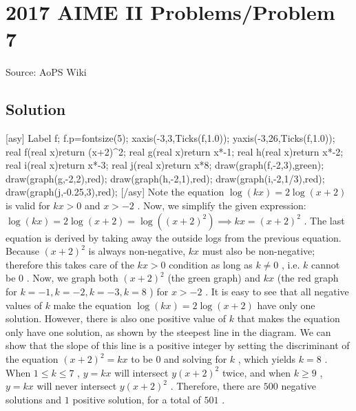 \documentclass[12pt]{article}
\begin{document}
\section*{{2017 AIME II Problems/Problem 7}}
Source: AoPS Wiki

\subsection*{Solution}
[asy] Label f; f.p=fontsize(5); xaxis(-3,3,Ticks(f,1.0)); yaxis(-3,26,Ticks(f,1.0)); real f(real x){return (x+2)^2;} real g(real x){return x*-1;} real h(real x){return x*-2;} real i(real x){return x*-3;} real j(real x){return x*8;} draw(graph(f,-2,3),green); draw(graph(g,-2,2),red); draw(graph(h,-2,1),red); draw(graph(i,-2,1/3),red); draw(graph(j,-0.25,3),red); [/asy] Note the equation $\log(kx)=2\log(x+2)$ is valid for $kx>0$ and $x>-2$ . Now, we simplify the given expression: $\log(kx)=2\log(x+2)=\log((x+2)^2) \implies kx=(x+2)^2$ . The last equation is derived by taking away the outside logs from the previous equation. Because $(x+2)^2$ is always non-negative, $kx$ must also be non-negative; therefore this takes care of the $kx>0$ condition as long as $k\neq0$ , i.e. $k$ cannot be $0$ . Now, we graph both $(x+2)^2$ (the green graph) and $kx$ (the red graph for $k=-1,k=-2,k=-3,k=8$ ) for $x>-2$ . It is easy to see that all negative values of $k$ make the equation $\log(kx)=2\log(x+2)$ have only one solution. However, there is also one positive value of $k$ that makes the equation only have one solution, as shown by the steepest line in the diagram. We can show that the slope of this line is a positive integer by setting the discriminant of the equation $(x+2)^2=kx$ to be $0$ and solving for $k$ , which yields $k=8$ . When $1\leq k \leq 7$ , $y=kx$ will intersect $y(x+2)^2$ twice, and when $k \geq 9$ , $y=kx$ will never intersect $y(x+2)^2$ . Therefore, there are $500$ negative solutions and $1$ positive solution, for a total of $\boxed{501}$ .
\end{document}
